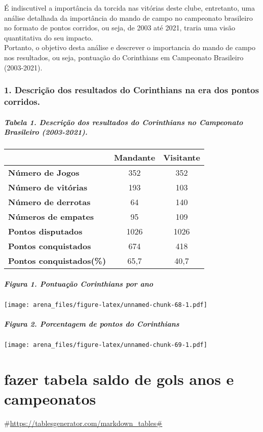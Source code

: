 \documentclass[
]{article}
\begin{document}
É indiscutivel a importância da torcida nas vitórias deste clube,
entretanto, uma análise detalhada da importância do mando de campo no
campeonato brasileiro no formato de pontos corridos, ou seja, de 2003
até 2021, traria uma visão quantitativa do seu impacto.\\
Portanto, o objetivo desta análise e descrever o importancia do mando de
campo nos resultados, ou seja, pontuação do Corinthians em Campeonato
Brasileiro (2003-2021).

\hypertarget{descriuxe7uxe3o-dos-resultados-do-corinthians-na-era-dos-pontos-corridos.}{%
\subsubsection{1. Descrição dos resultados do Corinthians na era dos
pontos
corridos.}\label{descriuxe7uxe3o-dos-resultados-do-corinthians-na-era-dos-pontos-corridos.}}

\hypertarget{tabela-1.-descriuxe7uxe3o-dos-resultados-do-corinthians-no-campeonato-brasileiro-2003-2021.}{%
\subparagraph{Tabela 1. Descrição dos resultados do Corinthians no
Campeonato Brasileiro
(2003-2021).}\label{tabela-1.-descriuxe7uxe3o-dos-resultados-do-corinthians-no-campeonato-brasileiro-2003-2021.}}

\begin{longtable}[]{@{}lcc@{}}
\toprule
& \textbf{Mandante} & \textbf{Visitante} \\
\midrule
\endhead
\textbf{Número de Jogos} & 352 & 352 \\
\textbf{Número de vitórias} & 193 & 103 \\
\textbf{Número de derrotas} & 64 & 140 \\
\textbf{Números de empates} & 95 & 109 \\
\textbf{Pontos disputados} & 1026 & 1026 \\
\textbf{Pontos conquistados} & 674 & 418 \\
\textbf{Pontos conquistados(\%)} & 65,7 & 40,7 \\
\bottomrule
\end{longtable}

\hypertarget{figura-1.-pontuauxe7uxe3o-corinthians-por-ano}{%
\subparagraph{Figura 1. Pontuação Corinthians por
ano}\label{figura-1.-pontuauxe7uxe3o-corinthians-por-ano}}

\texttt{[image: arena\_files/figure-latex/unnamed-chunk-68-1.pdf]}

\hypertarget{figura-2.-porcentagem-de-pontos-do-corinthians}{%
\subparagraph{Figura 2. Porcentagem de pontos do
Corinthians}\label{figura-2.-porcentagem-de-pontos-do-corinthians}}

\texttt{[image: arena\_files/figure-latex/unnamed-chunk-69-1.pdf]}

\hypertarget{fazer-tabela-saldo-de-gols-anos-e-campeonatos}{%
\section{fazer tabela saldo de gols anos e
campeonatos}\label{fazer-tabela-saldo-de-gols-anos-e-campeonatos}}

\#\url{https://tablesgenerator.com/markdown_tables\#}
\end{document}
